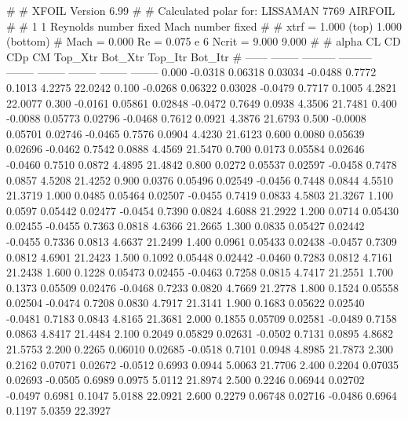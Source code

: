 #  
#       XFOIL         Version 6.99
#  
# Calculated polar for: LISSAMAN 7769 AIRFOIL                           
#  
# 1 1 Reynolds number fixed          Mach number fixed         
#  
# xtrf =   1.000 (top)        1.000 (bottom)  
# Mach =   0.000     Re =     0.075 e 6     Ncrit =   9.000  9.000
#  
#   alpha    CL        CD       CDp       CM     Top_Xtr  Bot_Xtr  Top_Itr  Bot_Itr
#  ------ -------- --------- --------- -------- -------- -------- -------- --------
   0.000  -0.0318   0.06318   0.03034  -0.0488   0.7772   0.1013   4.2275  22.0242
   0.100  -0.0268   0.06322   0.03028  -0.0479   0.7717   0.1005   4.2821  22.0077
   0.300  -0.0161   0.05861   0.02848  -0.0472   0.7649   0.0938   4.3506  21.7481
   0.400  -0.0088   0.05773   0.02796  -0.0468   0.7612   0.0921   4.3876  21.6793
   0.500  -0.0008   0.05701   0.02746  -0.0465   0.7576   0.0904   4.4230  21.6123
   0.600   0.0080   0.05639   0.02696  -0.0462   0.7542   0.0888   4.4569  21.5470
   0.700   0.0173   0.05584   0.02646  -0.0460   0.7510   0.0872   4.4895  21.4842
   0.800   0.0272   0.05537   0.02597  -0.0458   0.7478   0.0857   4.5208  21.4252
   0.900   0.0376   0.05496   0.02549  -0.0456   0.7448   0.0844   4.5510  21.3719
   1.000   0.0485   0.05464   0.02507  -0.0455   0.7419   0.0833   4.5803  21.3267
   1.100   0.0597   0.05442   0.02477  -0.0454   0.7390   0.0824   4.6088  21.2922
   1.200   0.0714   0.05430   0.02455  -0.0455   0.7363   0.0818   4.6366  21.2665
   1.300   0.0835   0.05427   0.02442  -0.0455   0.7336   0.0813   4.6637  21.2499
   1.400   0.0961   0.05433   0.02438  -0.0457   0.7309   0.0812   4.6901  21.2423
   1.500   0.1092   0.05448   0.02442  -0.0460   0.7283   0.0812   4.7161  21.2438
   1.600   0.1228   0.05473   0.02455  -0.0463   0.7258   0.0815   4.7417  21.2551
   1.700   0.1373   0.05509   0.02476  -0.0468   0.7233   0.0820   4.7669  21.2778
   1.800   0.1524   0.05558   0.02504  -0.0474   0.7208   0.0830   4.7917  21.3141
   1.900   0.1683   0.05622   0.02540  -0.0481   0.7183   0.0843   4.8165  21.3681
   2.000   0.1855   0.05709   0.02581  -0.0489   0.7158   0.0863   4.8417  21.4484
   2.100   0.2049   0.05829   0.02631  -0.0502   0.7131   0.0895   4.8682  21.5753
   2.200   0.2265   0.06010   0.02685  -0.0518   0.7101   0.0948   4.8985  21.7873
   2.300   0.2162   0.07071   0.02672  -0.0512   0.6993   0.0944   5.0063  21.7706
   2.400   0.2204   0.07035   0.02693  -0.0505   0.6989   0.0975   5.0112  21.8974
   2.500   0.2246   0.06944   0.02702  -0.0497   0.6981   0.1047   5.0188  22.0921
   2.600   0.2279   0.06748   0.02716  -0.0486   0.6964   0.1197   5.0359  22.3927
